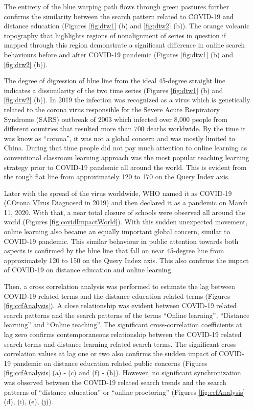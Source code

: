 \documentclass[11pt,a4paper,]{article}
\begin{document}
The entirety of the blue warping path flows through green pastures further confirms the similarity between the search pattern related to COVID-19 and distance education (Figures \ref{fig:dtw1} (b) and \ref{fig:dtw2} (b)). The orange volcanic topography that highlights regions of nonalignment of series in question if mapped through this region demonstrate a significant difference in online search behaviours before and after COVID-19 pandemic (Figures \ref{fig:dtw1} (b) and \ref{fig:dtw2} (b)).

The degree of digression of blue line from the ideal 45-degree straight line indicates a dissimilarity of the two time
series (Figures \ref{fig:dtw1} (b) and \ref{fig:dtw2} (b)). In 2019 the infection was recognized as a virus which is genetically related to the corona virus responsible for the Severe Acute Respiratory Syndrome (SARS) outbreak of 2003 which infected over 8,000 people from different countries that resulted more than 700 deaths worldwide. By the time it was know as ``corona'', it was not a global concern and was mostly limited to China. During that time people did not pay much attention to online learning as conventional classroom learning approach was the most popular teaching learning strategy prior to COVID-19 pandemic all around the world. This is evident from the rough flat line from approximately 120 to 170 on the Query Index axis.

Later with the spread of the virus worldwide, WHO named it as COVID-19 (COrona VIrus Diagnosed in 2019) and then declared it as a pandemic on March 11, 2020. With that, a near total closure of schools were observed all around the world (Figures \ref{fig:covidImpactWorld}). With this sudden unexpected movement, online learning also became an equally important global concern, similar to COVID-19 pandemic. This similar behaviour in public attention towards both aspects is confirmed by the blue line that fall on near 45-degree line from approximately 120 to 150 on the Query Index axis. This also confirms the impact of COVID-19 on distance education and online learning.

Then, a cross correlation analysis was performed to estimate the lag between COVID-19 related terms and the distance education related terms (Figures \ref{fig:ccfAnalysis}). A close relationship was evident between COVID-19 related search patterns and the search patterns of the terms ``Online learning'', ``Distance learning'' and ``Online teaching''. The significant cross-correlation coefficients at lag zero confirms contemporaneous relationship between the COVID-19 related search terms and distance learning related search terms. The significant cross correlation values at lag one or two also confirms the sudden impact of COVID-19 pandemic on distance education related public concerns (Figures \ref{fig:ccfAnalysis} (a) - (c) and (f) - (h)). However, no significant synchronization was observed between the COVID-19 related search trends and the search patterns of ``distance education'' or ``online proctoring'' (Figures \ref{fig:ccfAnalysis} (d), (i), (e), (j)).
\end{document}

